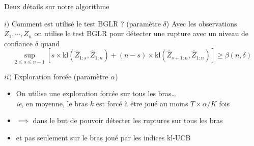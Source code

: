 \documentclass[11pt,french,ignorenonframetext,]{beamer}
\begin{document}
\begin{frame}{Deux détails sur notre algorithme}



  \begin{exampleblock}{$i)$ Comment est utilisé le test BGLR ? \hfill{} (paramètre $\delta$)}
    Avec les observations $Z_1,\cdots,Z_n$
    on utilise le test BGLR pour détecter une rupture
    avec un niveau de confiance $\delta$
    quand
      \[
        \sup_{2 \leq s \leq n-1} \left[s \times \mathrm{kl} \left( \widehat{Z}_{1:s}, \widehat{Z}_{1:n}\right) + (n-s) \times \mathrm{kl} \left( \widehat{Z}_{s+1:n}, \widehat{Z}_{1:n} \right) \right] \geq \beta(n,\delta)
        \]
  \end{exampleblock}

  \pause

  \begin{exampleblock}{$ii)$ Exploration forcée \hfill{} (paramètre $\alpha$)}
    \begin{itemize}
      \item On utilise une exploration forcée sur tous les bras\ldots\\
        \emph{ie}, en moyenne, le bras $k$ est forcé à être joué au moins $T \times \alpha / K$ fois
      \item $\implies$ dans le but de pouvoir détecter les ruptures sur tous les bras
      \item et pas seulement sur le bras joué par les indices kl-UCB
    \end{itemize}
  \end{exampleblock}

\end{frame}
\end{document}
